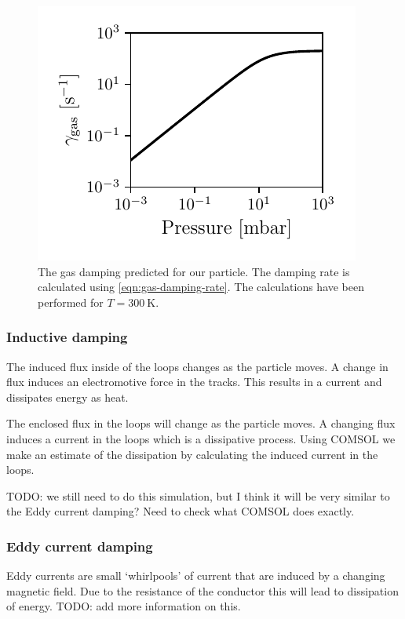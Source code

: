 \begin{figure}
    \centering
    \includegraphics{figures/data/gas_damping.pdf}
    \caption{The gas damping predicted for our particle. The damping rate is calculated using \autoref{eqn:gas-damping-rate}. The calculations have been performed for $T=\qty{300}{\kelvin}$.}
    \label{fig:gas-damping}
\end{figure}

\subsubsection{Inductive damping}
\label{subsubsec:inductive-damping}
The induced flux inside of the loops changes as the particle moves. A change in flux induces an electromotive force in the tracks. This results in a current and dissipates energy as heat.

The enclosed flux in the loops will change as the particle moves. A changing flux induces a current in the loops which is a dissipative process. Using COMSOL we make an estimate of the dissipation by calculating the induced current in the loops.

TODO: we still need to do this simulation, but I think it will be very similar to the Eddy current damping? Need to check what COMSOL does exactly.

\subsubsection{Eddy current damping}
\label{subsubsec:eddy-current-damping}
Eddy currents are small `whirlpools' of current that are induced by a changing magnetic field. Due to the resistance of the conductor this will lead to dissipation of energy.
TODO: add more information on this.
